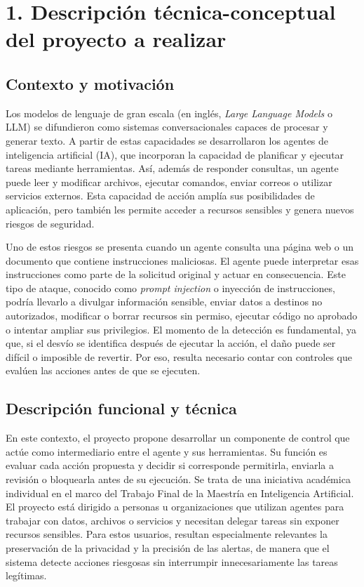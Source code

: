 \documentclass[
11pt, %
]{charter}
\begin{document}
\pagebreak

\section{1. Descripción técnica-conceptual del proyecto a realizar}
\label{sec:descripcion}

\subsection{Contexto y motivación}

Los modelos de lenguaje de gran escala (en inglés, \textit{Large Language Models} o LLM) se difundieron como sistemas conversacionales capaces de procesar y generar texto. A partir de estas capacidades se desarrollaron los agentes de inteligencia artificial (IA), que incorporan la capacidad de planificar y ejecutar tareas mediante herramientas. Así, además de responder consultas, un agente puede leer y modificar archivos, ejecutar comandos, enviar correos o utilizar servicios externos. Esta capacidad de acción amplía sus posibilidades de aplicación, pero también les permite acceder a recursos sensibles y genera nuevos riesgos de seguridad.

Uno de estos riesgos se presenta cuando un agente consulta una página web o un documento que contiene instrucciones maliciosas. El agente puede interpretar esas instrucciones como parte de la solicitud original y actuar en consecuencia. Este tipo de ataque, conocido como \textit{prompt injection} o inyección de instrucciones, podría llevarlo a divulgar información sensible, enviar datos a destinos no autorizados, modificar o borrar recursos sin permiso, ejecutar código no aprobado o intentar ampliar sus privilegios. El momento de la detección es fundamental, ya que, si el desvío se identifica después de ejecutar la acción, el daño puede ser difícil o imposible de revertir. Por eso, resulta necesario contar con controles que evalúen las acciones antes de que se ejecuten.

\subsection{Descripción funcional y técnica}

En este contexto, el proyecto propone desarrollar un componente de control que actúe como intermediario entre el agente y sus herramientas. Su función es evaluar cada acción propuesta y decidir si corresponde permitirla, enviarla a revisión o bloquearla antes de su ejecución. Se trata de una iniciativa académica individual en el marco del Trabajo Final de la Maestría en Inteligencia Artificial. El proyecto está dirigido a personas u organizaciones que utilizan agentes para trabajar con datos, archivos o servicios y necesitan delegar tareas sin exponer recursos sensibles. Para estos usuarios, resultan especialmente relevantes la preservación de la privacidad y la precisión de las alertas, de manera que el sistema detecte acciones riesgosas sin interrumpir innecesariamente las tareas legítimas.
\end{document}
